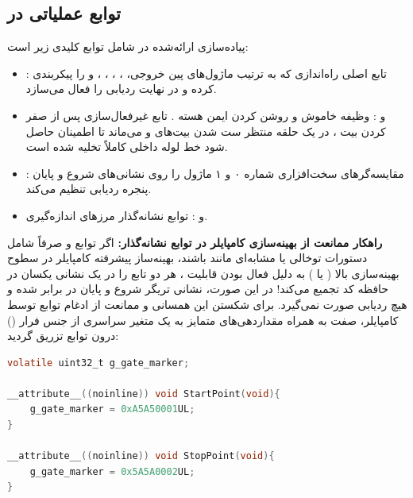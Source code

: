 \subsection{توابع عملیاتی در }
پیاده‌سازی ارائه‌شده در  شامل توابع کلیدی زیر است:
\begin{itemize}
    \item {}: تابع اصلی راه‌اندازی که به ترتیب ماژول‌های پین خروجی، ، ، ، ،  و  را پیکربندی کرده و در نهایت ردیابی را فعال می‌سازد.
    \item {} و : وظیفه خاموش و روشن کردن ایمن هسته . تابع غیرفعال‌سازی پس از صفر کردن بیت ، در یک حلقه منتظر ست شدن بیت‌های  و  می‌ماند تا اطمینان حاصل شود خط لوله داخلی کاملاً تخلیه شده است.
    \item {}: مقایسه‌گرهای سخت‌افزاری شماره ۰ و ۱ ماژول  را روی نشانی‌های شروع و پایان پنجره ردیابی تنظیم می‌کند.
    \item {} و : توابع نشانه‌گذار مرزهای اندازه‌گیری.
\end{itemize}

\textbf{راهکار ممانعت از بهینه‌سازی کامپایلر در توابع نشانه‌گذار:}
اگر توابع  و  صرفاً شامل دستورات توخالی یا مشابه‌ای مانند  باشند، بهینه‌ساز پیشرفته کامپایلر  در سطوح بهینه‌سازی بالا ( یا ) به دلیل فعال بودن قابلیت ، هر دو تابع را در یک نشانی یکسان در حافظه کد تجمیع می‌کند! در این صورت، نشانی تریگر شروع و پایان در  برابر شده و هیچ ردیابی صورت نمی‌گیرد. برای شکستن این همسانی و ممانعت از ادغام توابع توسط کامپایلر، صفت  به همراه مقداردهی‌های متمایز به یک متغیر سراسری از جنس فرار () درون توابع تزریق گردید:
\begin{latin}
\begin{lstlisting}[language=C, caption={\rl{پیاده‌سازی توابع نشانه‌گذار مرز پنجره با ممانعت از ادغام بهینه‌ساز}}]
volatile uint32_t g_gate_marker;

__attribute__((noinline)) void StartPoint(void){
    g_gate_marker = 0xA5A50001UL;
}

__attribute__((noinline)) void StopPoint(void){
    g_gate_marker = 0x5A5A0002UL;
}
\end{lstlisting}
\end{latin}

